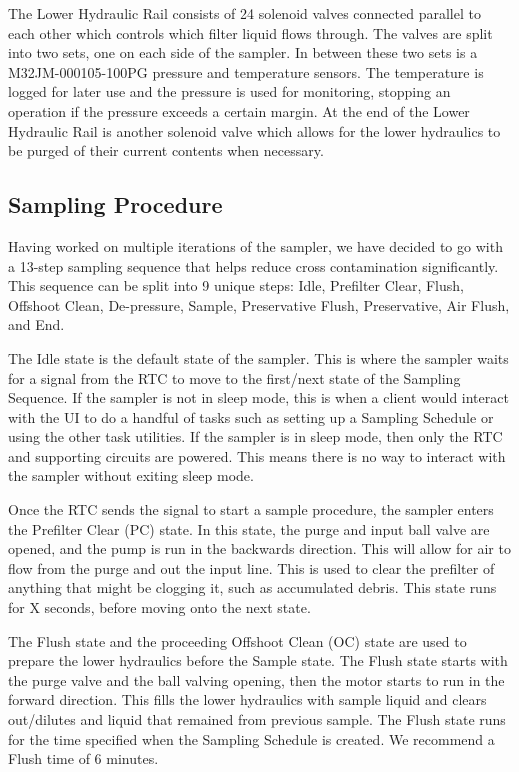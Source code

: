 \documentclass[11pt, letterpaper]{article}
\begin{document}

The Lower Hydraulic Rail consists of 24 solenoid valves connected parallel to each other which controls which filter liquid flows through. The valves are split into two sets, one on each side of the sampler. In between these two sets is a M32JM-000105-100PG pressure and temperature sensors. The temperature is logged for later use and the pressure is used for monitoring, stopping an operation if the pressure exceeds a certain margin. At the end of the Lower Hydraulic Rail is another solenoid valve which allows for the lower hydraulics to be purged of their current contents when necessary.


\subsection{Sampling Procedure}
Having worked on multiple iterations of the sampler, we have decided to go with a 13-step sampling sequence that helps reduce cross contamination significantly. This sequence can be split into 9 unique steps: Idle, Prefilter Clear, Flush, Offshoot Clean, De-pressure, Sample, Preservative Flush, Preservative, Air Flush, and End.


The Idle state is the default state of the sampler. This is where the sampler waits for a signal from the RTC to move to the first/next state of the Sampling Sequence. If the sampler is not in sleep mode, this is when a client would interact with the UI to do a handful of tasks such as setting up a Sampling Schedule or using the other task utilities. If the sampler is in sleep mode, then only the RTC and supporting circuits are powered. This means there is no way to interact with the sampler without exiting sleep mode.

Once the RTC sends the signal to start a sample procedure, the sampler enters the Prefilter Clear (PC) state. In this state, the purge and input ball valve are opened, and the pump is run in the backwards direction. This will allow for air to flow from the purge and out the input line. This is used to clear the prefilter of anything that might be clogging it, such as accumulated debris. This state runs for X seconds, before moving onto the next state. 

The Flush state and the proceeding Offshoot Clean (OC) state are used to prepare the lower hydraulics before the Sample state. The Flush state starts with the purge valve and the ball valving opening, then the motor starts to run in the forward direction. This fills the lower hydraulics with sample liquid and clears out/dilutes and liquid that remained from previous sample. The Flush state runs for the time specified when the Sampling Schedule is created. We recommend a Flush time of 6 minutes. 
\end{document}
